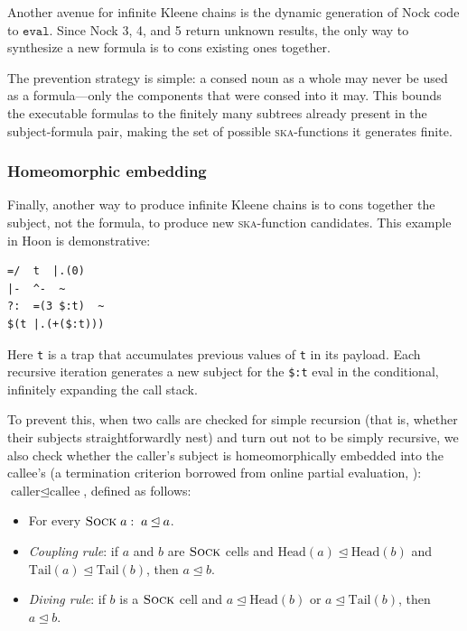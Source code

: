 \documentclass[twoside]{article}
\begin{document}
Another avenue for infinite Kleene chains is the dynamic generation of Nock code to $\mathtt{eval}$. Since Nock 3, 4, and 5 return unknown results, the only way to synthesize a new formula is to cons existing ones together.

The prevention strategy is simple: a consed noun as a whole may never be used as a formula---only the components that were consed into it may. This bounds the executable formulas to the finitely many subtrees already present in the subject-formula pair, making the set of possible \textsc{ska}-functions it generates finite.

\subsubsection{Homeomorphic embedding}

Finally, another way to produce infinite Kleene chains is to cons together the subject, not the formula, to produce new \textsc{ska}-function candidates. This example in Hoon is demonstrative:

\begin{lstlisting}[style=listingcode]
=/  t  |.(0)
|-  ^-  ~
?:  =(3 $:t)  ~
$(t |.(+($:t)))
\end{lstlisting}

Here \texttt{t} is a trap that accumulates previous values of \texttt{t} in its payload. Each recursive iteration generates a new subject for the \lstinline[style=inlinecode]{$:t} eval in the conditional, infinitely expanding the call stack.

To prevent this, when two calls are checked for simple recursion (that is, whether their subjects straightforwardly nest) and turn out not to be simply recursive, we also check whether the caller's subject is homeomorphically embedded into the callee's (a termination criterion borrowed from online partial evaluation, \citet{leuschel-he}): $\text{caller} \unlhd \text{callee}$, defined as follows:
\begin{itemize}
  \item  For every $\textsc{Sock}\;a:\;a \unlhd a$.
  \item  \emph{Coupling rule}: if $a$ and $b$ are $\textsc{Sock}$ cells and $\text{Head}(a)\unlhd\text{Head}(b)$ and $\text{Tail}(a)\unlhd\text{Tail}(b)$, then $a \unlhd b$.
  \item  \emph{Diving rule}: if $b$ is a $\textsc{Sock}$ cell and $a \unlhd \text{Head}(b)$ or $a \unlhd \text{Tail}(b)$, then $a \unlhd b$.
\end{itemize}
\end{document}
